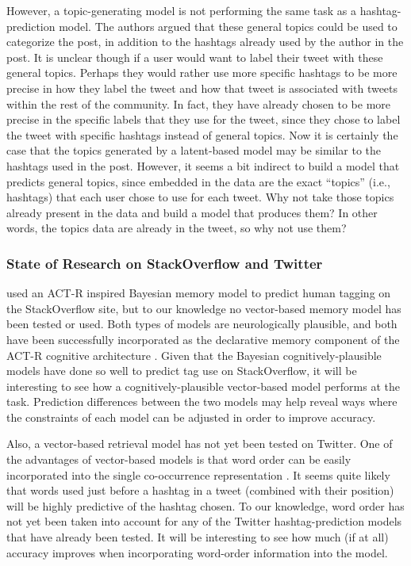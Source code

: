 \documentclass[man,floatsintext,donotrepeattitle]{apa6}
\begin{document}
However, a topic-generating model is not performing the same task as a hashtag-prediction model.
The authors argued that these general topics could be used to categorize the post, in addition to the hashtags already used by the author in the post.
It is unclear though if a user would want to label their tweet with these general topics.
Perhaps they would rather use more specific hashtags to be more precise in how they label the tweet and how that tweet is associated with tweets within the rest of the community.
In fact, they have already chosen to be more precise in the specific labels that they use for the tweet, since they chose to label the tweet with specific hashtags instead of general topics.
Now it is certainly the case that the topics generated by a latent-based model may be similar to the hashtags used in the post.
However, it seems a bit indirect to build a model that predicts general topics, since embedded in the data are the exact ``topics'' (i.e., hashtags) that each user chose to use for each tweet.
Why not take those topics already present in the data and build a model that produces them?
In other words, the topics data are already in the tweet, so why not use them?

\subsubsection{State of Research on StackOverflow and Twitter}

\textcite{Stanley2013} used an ACT-R inspired Bayesian memory model to predict human tagging on the StackOverflow site, but to our knowledge no vector-based memory model has been tested or used.
Both types of models are neurologically plausible, and both have been successfully incorporated as the declarative memory component of the ACT-R cognitive architecture \parencite{Rutledge2007}. 
Given that the Bayesian cognitively-plausible models have done so well to predict tag use on StackOverflow, it will be interesting to see how a cognitively-plausible vector-based model performs at the task.
Prediction differences between the two models may help reveal ways where the constraints of each model can be adjusted in order to improve accuracy.

Also, a vector-based retrieval model has not yet been tested on Twitter.
One of the advantages of vector-based models is that word order can be easily incorporated into the single co-occurrence representation \parencite{Jones2007}.
It seems quite likely that words used just before a hashtag in a tweet (combined with their position) will be highly predictive of the hashtag chosen.
To our knowledge, word order has not yet been taken into account for any of the Twitter hashtag-prediction models that have already been tested.
It will be interesting to see how much (if at all) accuracy improves when incorporating word-order information into the model.
\end{document}
